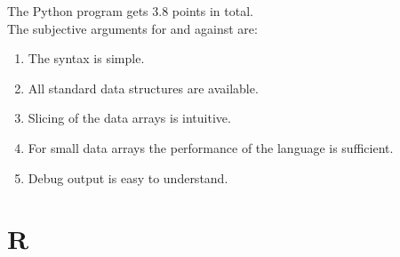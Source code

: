 \documentclass[
  twoside,
  11pt, a4paper,
  footinclude=true,
  headinclude=true,
  cleardoublepage=empty
]{scrreprt}
\begin{document}
    The Python program gets 3.8 points in total.\\
    The subjective arguments for and against are: 
    \begin{enumerate}
        \item The syntax is simple.
        \item All standard data structures are available.
        \item Slicing of the data arrays is intuitive.
        \item For small data arrays the performance of the language is sufficient.
        \item Debug output is easy to understand.
    \end{enumerate}  
    
    \chapter{R}
\end{document}
